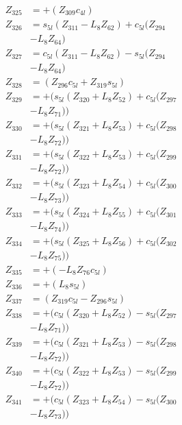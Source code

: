 \begin{multicols}{2}
\begin{align}
Z_{325} &= + (Z_{309}c_{4l}) \nonumber \\
Z_{326} &= s_{5l}(Z_{311} - L_8Z_{62}) + c_{5l}(Z_{294}  \nonumber \\
&- L_8Z_{64}) \nonumber \\
Z_{327} &= c_{5l}(Z_{311} - L_8Z_{62}) - s_{5l}(Z_{294}  \nonumber \\
&- L_8Z_{64}) \nonumber \\
Z_{328} &= (Z_{296}c_{5l} + Z_{319}s_{5l}) \nonumber \\
Z_{329} &= + (s_{5l}(Z_{320} + L_8Z_{52}) + c_{5l}(Z_{297}  \nonumber \\
&- L_8Z_{71})) \nonumber \\
Z_{330} &= + (s_{5l}(Z_{321} + L_8Z_{53}) + c_{5l}(Z_{298}  \nonumber \\
&- L_8Z_{72})) \nonumber \\
Z_{331} &= + (s_{5l}(Z_{322} + L_8Z_{53}) + c_{5l}(Z_{299}  \nonumber \\
&- L_8Z_{72})) \nonumber \\
Z_{332} &= + (s_{5l}(Z_{323} + L_8Z_{54}) + c_{5l}(Z_{300}  \nonumber \\
&- L_8Z_{73})) \nonumber \\
Z_{333} &= + (s_{5l}(Z_{324} + L_8Z_{55}) + c_{5l}(Z_{301}  \nonumber \\
&- L_8Z_{74})) \nonumber \\
Z_{334} &= + (s_{5l}(Z_{325} + L_8Z_{56}) + c_{5l}(Z_{302}  \nonumber \\
&- L_8Z_{75})) \nonumber \\
Z_{335} &= + (-L_8Z_{76}c_{5l}) \nonumber \\
Z_{336} &= + (L_8s_{5l}) \nonumber \\
Z_{337} &= (Z_{319}c_{5l} - Z_{296}s_{5l}) \nonumber \\
Z_{338} &= + (c_{5l}(Z_{320} + L_8Z_{52}) - s_{5l}(Z_{297}  \nonumber \\
&- L_8Z_{71})) \nonumber \\
Z_{339} &= + (c_{5l}(Z_{321} + L_8Z_{53}) - s_{5l}(Z_{298}  \nonumber \\
&- L_8Z_{72})) \nonumber \\
Z_{340} &= + (c_{5l}(Z_{322} + L_8Z_{53}) - s_{5l}(Z_{299}  \nonumber \\
&- L_8Z_{72})) \nonumber \\
Z_{341} &= + (c_{5l}(Z_{323} + L_8Z_{54}) - s_{5l}(Z_{300}  \nonumber \\
&- L_8Z_{73})) \nonumber \\

\end{align}
\end{multicols}
